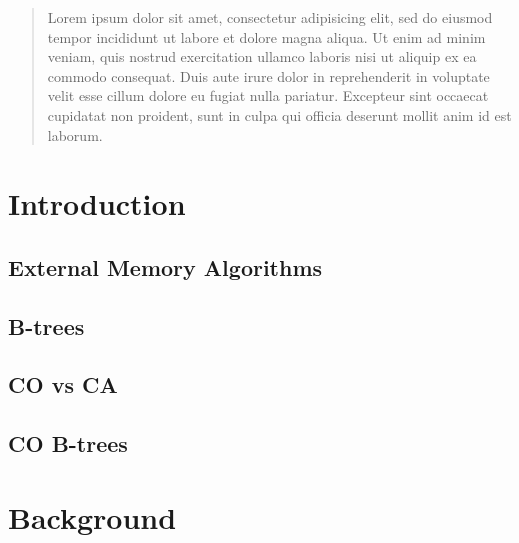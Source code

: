 \documentclass{style}
\begin{document}
\newcommand{\lhyperceil}{\lceil\lceil}
\newcommand{\rhyperceil}{\rceil\rceil}
\newcommand{\lhyperfloor}{\lfloor\lfloor}
\newcommand{\rhyperfloor}{\rfloor\rfloor}

\newcommand{\Search}{\textsc{Search(k)}}
\newcommand{\Insert}{\textsc{Insert(k, v)}}
\newcommand{\Scan}{\textsc{Scan(a, b)}}
\newcommand{\Delete}{\textsc{Delete(k)}}

\maketitle
\begin{abstract}

Lorem ipsum dolor sit amet, consectetur adipisicing elit, sed do eiusmod tempor incididunt ut labore et dolore magna aliqua. Ut enim ad minim veniam, quis nostrud exercitation ullamco laboris nisi ut aliquip ex ea commodo consequat. Duis aute irure dolor in reprehenderit in voluptate velit esse cillum dolore eu fugiat nulla pariatur. Excepteur sint occaecat cupidatat non proident, sunt in culpa qui officia deserunt mollit anim id est laborum.

\end{abstract}

\section{Introduction}

\subsection{External Memory Algorithms}

\subsection{B-trees}

\subsection{CO vs CA}

\subsection{CO B-trees}

\section{Background}
\end{document}
